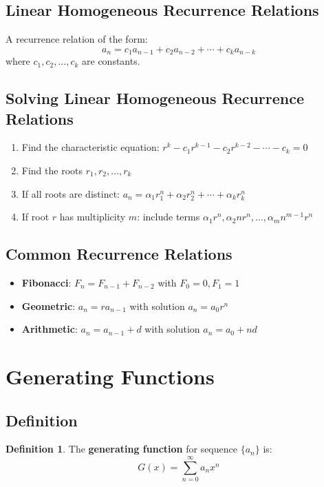 \documentclass[11pt]{article}
\theoremstyle{definition}
\newtheorem{definition}{Definition}[section]
\begin{document}
\subsection{Linear Homogeneous Recurrence Relations}
A recurrence relation of the form:
$$a_n = c_1 a_{n-1} + c_2 a_{n-2} + \cdots + c_k a_{n-k}$$
where $c_1, c_2, \ldots, c_k$ are constants.

\subsection{Solving Linear Homogeneous Recurrence Relations}
\begin{enumerate}
    \item Find the characteristic equation: $r^k - c_1 r^{k-1} - c_2 r^{k-2} - \cdots - c_k = 0$
    \item Find the roots $r_1, r_2, \ldots, r_k$
    \item If all roots are distinct: $a_n = \alpha_1 r_1^n + \alpha_2 r_2^n + \cdots + \alpha_k r_k^n$
    \item If root $r$ has multiplicity $m$: include terms $\alpha_1 r^n, \alpha_2 n r^n, \ldots, \alpha_m n^{m-1} r^n$
\end{enumerate}

\subsection{Common Recurrence Relations}
\begin{itemize}
    \item \textbf{Fibonacci}: $F_n = F_{n-1} + F_{n-2}$ with $F_0 = 0, F_1 = 1$
    \item \textbf{Geometric}: $a_n = r a_{n-1}$ with solution $a_n = a_0 r^n$
    \item \textbf{Arithmetic}: $a_n = a_{n-1} + d$ with solution $a_n = a_0 + nd$
\end{itemize}

\section{Generating Functions}

\subsection{Definition}
\begin{definition}
The \textbf{generating function} for sequence $\{a_n\}$ is:
$$G(x) = \sum_{n=0}^{\infty} a_n x^n$$
\end{definition}
\end{document}

